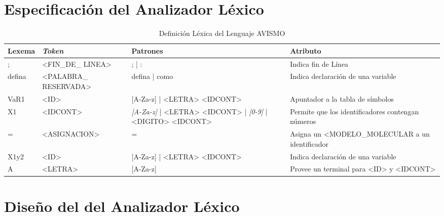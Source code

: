 \section{Especificación del Analizador Léxico}

\begin{table}[ht]
    \footnotesize
    \begin{tabularx}{\linewidth}{|X|X|X|X|}
        \hline
        Lexema & \textit{Token}        & Patrones                                                              & Atributo                                          \\\hline
        ;      & <FIN\_DE\_ LINEA>     & ; | :                                                                 & Indica fin de Línea                               \\\hline
        defina & <PALABRA\_ RESERVADA> & defina | como                                                         & Indica declaración de una variable                \\\hline
        VaR1   & <ID>                  & [A-Za-z] | <LETRA> <IDCONT>                                           & Apuntador a la tabla de símbolos                  \\\hline
        X1     & <IDCONT>              & \textit{[A-Za-z]} | <LETRA> <IDCONT> | \textit{[0-9]} | <DIGITO> <IDCONT> & Permite que los identificadores contengan números \\\hline
        =      & <ASIGNACION>          & =                                                                     & Asigna un <MODELO\_MOLECULAR a un identificador   \\\hline
        X1y2   & <ID>                  & [A-Za-z] | <LETRA> <IDCONT>                                           & Indica declaración de una variable                \\\hline
        A      & <LETRA>               & [A-Za-z]                                                              & Provee un terminal para <ID> y <IDCONT>           \\\hline
    \end{tabularx}
    \label{table: lexTable}
    \caption{Definición Léxica del Lenguaje AVISMO}
\end{table}

\section{Diseño del del Analizador Léxico}


